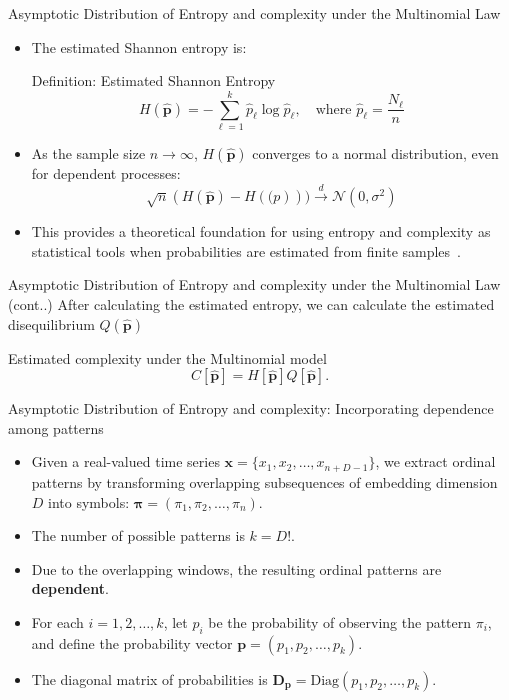 \documentclass{beamer}
\begin{document}
\begin{frame}{Asymptotic Distribution of Entropy and complexity under the Multinomial Law}
	\begin{itemize}
		\item The estimated Shannon entropy is:
		\begin{block}{Definition: Estimated Shannon Entropy}
			\[
			H(\widehat{\mathbf{p}}) = -\sum_{\ell=1}^k \hat{p}_\ell \log \hat{p}_\ell, \quad \text{where } \hat{p}_\ell = \frac{N_\ell}{n}
			\]
		\end{block}
	
		\item As the sample size $n \rightarrow \infty$, $H(\widehat{\mathbf{p}})$ converges to a normal distribution, even for dependent processes:
		\[
		\sqrt{n}(H(\widehat{\mathbf{p}}) - H(\mathbf(p))) \xrightarrow{d} \mathcal{N}(0, \sigma^2)
		\]
		\item This provides a theoretical foundation for using entropy and complexity as statistical tools when probabilities are estimated from finite samples~\cite{Rey2023}.
	\end{itemize}
\end{frame}


\begin{frame}{Asymptotic Distribution of Entropy and complexity under the Multinomial Law (cont..)}
	After calculating the estimated entropy, we can calculate the estimated disequilibrium $Q(\widehat{\mathbf{p}})$ 
	
	\begin{block}{Estimated complexity under the Multinomial model}
		\[	C[\widehat{\bm{p}}]=H[\widehat{\bm{p}}]Q[\widehat{\bm{p}}].\]
	\end{block}
\end{frame}

\begin{frame}{Asymptotic Distribution of Entropy and complexity: Incorporating dependence among patterns}
	\begin{itemize}
		\item Given a real-valued time series $\mathbf{x} = \{x_1, x_2, \ldots, x_{n+D-1}\}$, we extract ordinal patterns by transforming overlapping subsequences of embedding dimension $D$ into symbols: $\mathbf{\pi} = (\pi_1, \pi_2, \ldots, \pi_n)$.
		\item The number of possible patterns is $k = D!$.
		\item Due to the overlapping windows, the resulting ordinal patterns are \textbf{dependent}.
		\item For each $i = 1, 2, \ldots, k$, let $p_i$ be the probability of observing the pattern $\pi_i$, and define the probability vector $\mathbf{p} = (p_1, p_2, \ldots, p_k)$.
		\item The diagonal matrix of probabilities is $\mathbf{D_p} = \text{Diag}(p_1, p_2, \ldots, p_k)$.
	\end{itemize}
\end{frame}
\end{document}
